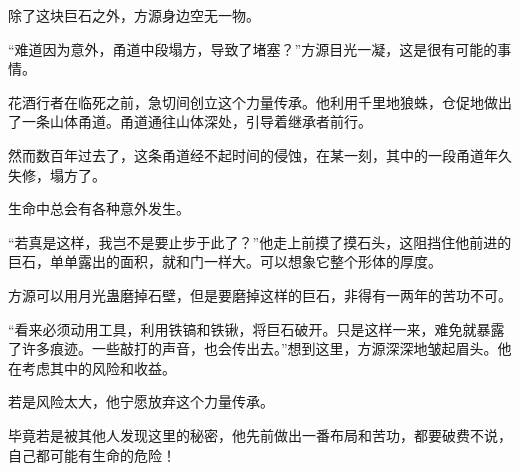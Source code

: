 \begin{this_body}
除了这块巨石之外，方源身边空无一物。

“难道因为意外，甬道中段塌方，导致了堵塞？”方源目光一凝，这是很有可能的事情。

花酒行者在临死之前，急切间创立这个力量传承。他利用千里地狼蛛，仓促地做出了一条山体甬道。甬道通往山体深处，引导着继承者前行。

然而数百年过去了，这条甬道经不起时间的侵蚀，在某一刻，其中的一段甬道年久失修，塌方了。

生命中总会有各种意外发生。

“若真是这样，我岂不是要止步于此了？”他走上前摸了摸石头，这阻挡住他前进的巨石，单单露出的面积，就和门一样大。可以想象它整个形体的厚度。

方源可以用月光蛊磨掉石壁，但是要磨掉这样的巨石，非得有一两年的苦功不可。

“看来必须动用工具，利用铁镐和铁锹，将巨石破开。只是这样一来，难免就暴露了许多痕迹。一些敲打的声音，也会传出去。”想到这里，方源深深地皱起眉头。他在考虑其中的风险和收益。

若是风险太大，他宁愿放弃这个力量传承。

毕竟若是被其他人发现这里的秘密，他先前做出一番布局和苦功，都要破费不说，自己都可能有生命的危险！

\end{this_body}

